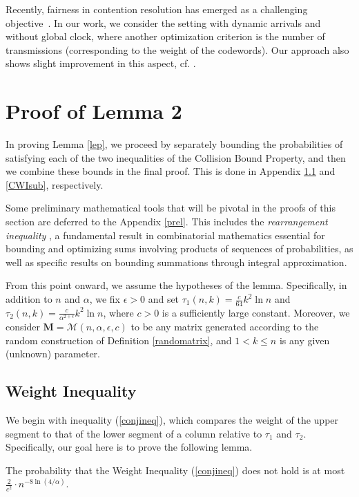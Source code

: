 \documentclass[11pt]{article}
\begin{document}
Recently, fairness in contention resolution has emerged as a challenging objective~\cite{ChionasCKK23}. 
In our work, we consider the setting with dynamic arrivals 
{and without global clock,} where another optimization 
criterion is the number of transmissions (corresponding to the weight of the codewords). 
Our approach also shows slight improvement in this aspect, cf. \cite{M2021}.




\section{Proof of Lemma 2}\label{proofs}

In proving Lemma \ref{lep}, we proceed by separately bounding the probabilities of satisfying 
each of the two inequalities of the Collision Bound Property, and then we combine these bounds 
in the final proof. This is done in Appendix \ref{WIsub} and \ref{CWIsub}, respectively.

{Some preliminary mathematical tools that will be pivotal in the proofs of this section are
deferred to the Appendix \ref{prel}. 
This includes the \textit{rearrangement inequality} \cite{HLP1934}, a fundamental 
result in combinatorial mathematics essential for bounding and optimizing sums involving products 
of sequences of probabilities, as well as specific results on bounding summations through integral approximation.
}

From this point onward, we assume the hypotheses of the lemma. 
Specifically, in addition to $n$ and $\alpha$, we fix $\epsilon > 0$ and set 
$\tau_1(n,k) = \frac{c}{64 } k^2 \ln n$ 
and $\tau_2(n,k) = \frac{c}{\alpha^{2+\epsilon}} k^2 \ln n$, where $c > 0$ is a sufficiently 
large constant. Moreover, we consider $\mathbf{M} = \mathcal{M}(n, \alpha, \epsilon, c)$ to 
be any matrix generated according to the random construction of Definition \ref{randomatrix}, 
and $1 < k \leq n$ is any given (unknown) parameter.

\subsection{Weight Inequality}\label{WIsub}

We begin with inequality (\ref{conjineq}), which compares the weight 
of the upper segment to that of the lower segment of a column relative to $\tau_1$ and $\tau_2$.
Specifically, our goal here is to prove the following lemma.
\begin{lemma}\label{lep1}
The probability that the Weight Inequality (\ref{conjineq}) 
does not hold is at most 
$\frac{2}{c^2} \cdot n^{-8\ln(4/\alpha)} $.
\end{lemma}
\end{document}
